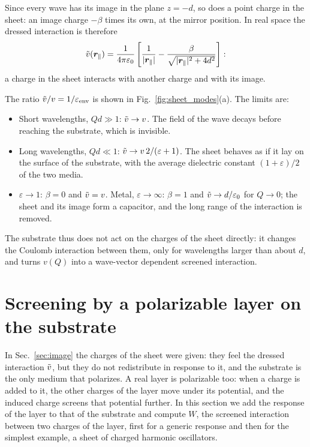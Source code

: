\documentclass[10pt,a4paper]{paper}
\begin{document}
Since every wave has its image in the plane $z = -d$, so does a point charge in the sheet: an image charge $-\beta$
times its own, at the mirror position. In real space the dressed interaction is therefore
\begin{equation}
\tilde{v}(\bm{r}_{\parallel}) = \frac{1}{4\pi\varepsilon_0}\left[\frac{1}{|\bm{r}_{\parallel}|} - \frac{\beta}{\sqrt{|\bm{r}_{\parallel}|^2 + 4d^2}}\right] :
\label{eq:vt_real}
\end{equation}
a charge in the sheet interacts with another charge and with its image.

The ratio $\tilde{v}/v = 1/\varepsilon_{\mathrm{env}}$ is shown in Fig.~\ref{fig:sheet_modes}(a). The limits are:
\begin{itemize}
\item Short wavelengths, $Qd \gg 1$: $\tilde{v} \to v$. The field of the wave decays before reaching the substrate,
  which is invisible.
\item Long wavelengths, $Qd \ll 1$: $\tilde{v} \to v\,2/(\varepsilon + 1)$. The sheet behaves as if it lay on the surface
  of the substrate, with the average dielectric constant $(1 + \varepsilon)/2$ of the two media.
\item $\varepsilon \to 1$: $\beta = 0$ and $\tilde{v} = v$. Metal, $\varepsilon \to \infty$: $\beta = 1$ and
  $\tilde{v} \to d/\varepsilon_0$ for $Q \to 0$; the sheet and its image form a capacitor, and the long range of the
  interaction is removed.
\end{itemize}
The substrate thus does not act on the charges of the sheet directly: it changes the Coulomb interaction between
them, only for wavelengths larger than about $d$, and turns $v(Q)$ into a wave-vector dependent screened interaction.

\section{Screening by a polarizable layer on the substrate}
\label{sec:layer_screening}

In Sec.~\ref{sec:image} the charges of the sheet were given: they feel the dressed interaction $\tilde{v}$, but they do not
redistribute in response to it, and the substrate is the only medium that polarizes. A real layer is polarizable
too: when a charge is added to it, the other charges of the layer move under its potential, and the induced charge
screens that potential further. In this section we add the response of the layer to that of the substrate and compute
$W$, the screened interaction between two charges of the layer, first for a generic response and then for the
simplest example, a sheet of charged harmonic oscillators.
\end{document}
